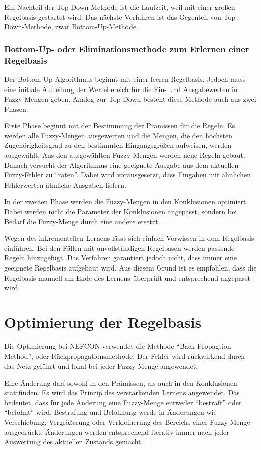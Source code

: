 Ein Nachteil der Top-Down-Methode ist die Laufzeit, weil mit einer großen Regelbasis gestartet wird. Das nächste Verfahren ist das Gegenteil von Top-Down-Methode, zwar Bottom-Up-Methode. \cite{CIKruse:15}


\subsubsection{Bottom-Up- oder Eliminationsmethode zum Erlernen einer Regelbasis}

Der Bottom-Up-Algorithmus beginnt mit einer leeren Regelbasis. Jedoch muss eine initiale Aufteilung der Wertebereich für die Ein- und Ausgabewerten in Fuzzy-Mengen geben. Analog zur Top-Down besteht diese Methode auch aus zwei Phasen. 

Erste Phase beginnt mit der Bestimmung der Prämissen für die Regeln. Es werden alle Fuzzy-Mengen ausgewerten und die Mengen, die den höchsten Zugehörigkeitsgrad zu den bestimmten Eingangsgrößen aufweisen, werden ausgewählt. Aus den ausgewählten Fuzzy-Mengen werden neue Regeln gebaut. Danach versucht der Algorithmus eine geeignete Ausgabe aus dem aktuellen Fuzzy-Fehler zu ``raten''. Dabei wird vorausgesetzt, dass Eingaben mit ähnlichen Fehlerwerten ähnliche Ausgaben liefern.

In der zweiten Phase werden die Fuzzy-Mengen in den Konklusionen optimiert. Dabei werden nicht die Parameter der Konklusionen angepasst, sondern bei Bedarf die Fuzzy-Menge durch eine andere ersetzt.

Wegen des inkrementellen Lernens lässt sich einfach Vorwissen in dem Regelbasis einführen. Bei den Fällen mit unvollständigen Regelbasen werden passende Regeln hinzugefügt. Das Verfahren garantiert jedoch nicht, dass immer eine geeignete Regelbasis aufgebaut wird. Aus diesem Grund ist es empfohlen, dass die Regelbasis manuell am Ende des Lernens überprüft und entsprechend angepasst wird. \cite{CIKruse:15} \cite{UNIMAG:97}

\section{Optimierung der Regelbasis}

Die Optimierung bei NEFCON verwendet die Methode ``Back Propagtion Method'', oder Rückpropagationsmethode. Der Fehler wird rückwirkend durch das Netz geführt und lokal bei jeder Fuzzy-Menge angewendet.

Eine Änderung darf sowohl in den Prämissen, als auch in den Konklusionen stattfinden. Es wird das Prinzip des verstärkenden Lernens angewendet. Das bedeutet, dass für jede Änderung eine Fuzzy-Menge entweder ``bestraft'' oder ``belohnt'' wird. Bestrafung und Belohnung werde in Änderungen wie Verschiebung, Vergrößerung oder Verkleinerung des Bereichs einer Fuzzy-Menge ausgedrückt. Änderungen werden entsprechend iterativ immer nach jeder Auswertung des aktuellen Zustands gemacht. \cite{CIKruse:15} \cite{UNIMAG:97}

